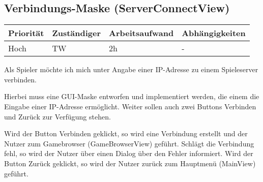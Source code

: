 \documentclass[a4paper]{scrreprt}
\newenvironment{requirement}[5] {
	\subsection{#1}
	\begin{tabularx}{\textwidth}{|X|l|X|X|}
		\hline
		Priorität & Zuständiger & Arbeitsaufwand & Abhängigkeiten \\
		\hline
		#2 & #3 & #4 & #5 \\
		\hline
	\end{tabularx}
	}{
	\newpage
	}
\begin{document}
\begin{requirement}{Verbindungs-Maske (ServerConnectView)}{Hoch}{TW}{2h}{-}

\begin{center}
	Als Spieler möchte ich mich unter Angabe einer IP-Adresse zu einem Spieleserver verbinden.
\end{center}

Hierbei muss eine GUI-Maske entworfen und implementiert werden, die einem die Eingabe einer IP-Adresse ermöglicht. Weiter sollen auch zwei Buttons \glqq Verbinden \grqq{} und \glqq Zurück \grqq{} zur Verfügung stehen.

Wird der Button \glqq Verbinden\grqq{} geklickt, so wird eine Verbindung erstellt und der Nutzer zum Gamebrowser (\glqq GameBrowserView\grqq{})  geführt. Schlägt die Verbindung fehl, so wird der Nutzer über einen Dialog über den Fehler informiert.
Wird der Button \glqq Zurück\grqq{} geklickt, so wird der Nutzer zurück zum Hauptmenü (\glqq MainView\grqq{}) geführt.

\end{requirement}
\end{document}
